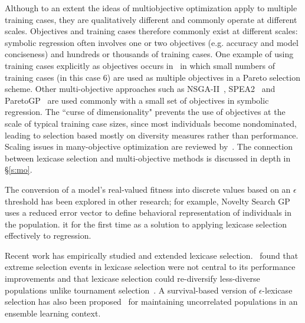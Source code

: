 \documentclass[twoside]{article}
\begin{document}
Although to an extent the ideas of multiobjective optimization apply to multiple training cases, they are qualitatively different and commonly operate at different scales. Objectives and training cases therefore commonly exist at different scales: symbolic regression often involves one or two objectives (e.g. accuracy and model conciseness) and hundreds or thousands of training cases. One example of using training cases explicitly as objectives occurs in~\cite{langdon_evolving_1995} in which small numbers of training cases (in this case 6) are used as multiple objectives in a Pareto selection scheme. Other multi-objective approaches such as NSGA-II~\citep{schoenauer_fast_2000}, SPEA2~\citep{zitzler_spea2:_2001} and ParetoGP~\citep{smits_pareto-front_2005} are used commonly with a small set of objectives in symbolic regression. The ``curse of dimensionality" prevents the use of objectives at the scale of typical training case sizes, since most individuals become nondominated, leading to selection based mostly on diversity measures rather than performance. Scaling issues in many-objective optimization are reviewed by~\cite{ishibuchi_evolutionary_2008}. The connection between lexicase selection and multi-objective methods is discussed in depth in \S\ref{s:mo}.
 
The conversion of a model's real-valued fitness into discrete values based on an $\epsilon$ threshold has been explored in other research; for example, Novelty Search GP~\citep{martinez_searching_2013} uses a reduced error vector to define behavioral representation of individuals in the population. \cite{la_cava_epsilon-lexicase_2016} it for the first time as a solution to applying lexicase selection effectively to regression.

Recent work has empirically studied and extended lexicase selection.~\cite{helmuth_impact_2016} found that extreme selection events in lexicase selection were not central to its performance improvements and that lexicase selection could re-diversify less-diverse populations unlike tournament selection~\citep{helmuth_effects_2016}. A survival-based version of $\epsilon$-lexicase selection has also been proposed~\citep{la_cava_general_2017,la_cava_ensemble_2017} for maintaining uncorrelated populations in an ensemble learning context. 
\end{document}
